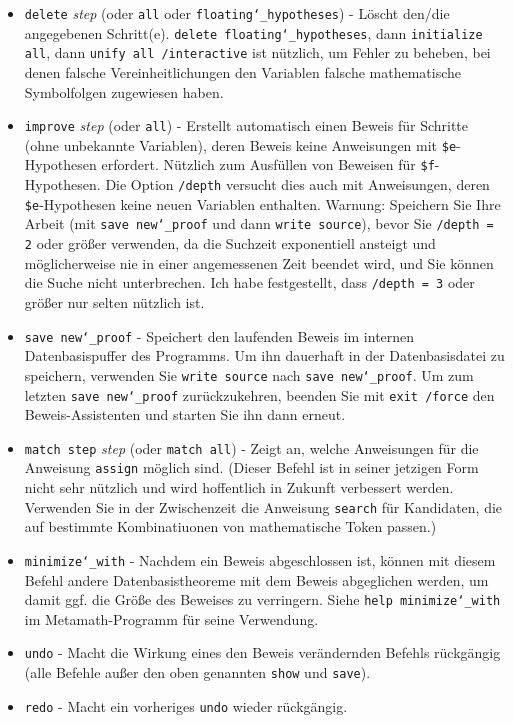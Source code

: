 \begin{itemize}
\item[]
    \texttt{delete} {\em step} (oder \texttt{all} oder \texttt{floating{\char`\_}hypotheses}) - Löscht den/die angegebenen Schritt(e).  \texttt{delete floating{\char`\_}hypotheses}, dann\linebreak
    \texttt{initialize all}, dann \texttt{unify all /interactive} ist nützlich, um Fehler zu beheben, bei denen falsche Vereinheitlichungen den Variablen falsche mathematische Symbolfolgen zugewiesen haben.
\item[]
    \texttt{improve} {\em step} (oder \texttt{all}) - Erstellt automatisch einen Beweis für Schritte (ohne unbekannte Variablen), deren Beweis keine Anweisungen mit \texttt{\$e}-Hypothesen erfordert.  Nützlich zum Ausfüllen von Beweisen für \texttt{\$f}-Hypothesen.  Die Option \texttt{/depth} versucht dies auch mit Anweisungen, deren \texttt{\$e}-Hypothesen keine neuen Variablen enthalten.  {Warnung:} Speichern Sie Ihre Arbeit (mit \texttt{save new{\char`\_}proof} und dann \texttt{write source}), bevor Sie \texttt{/depth = 2} oder größer verwenden, da die Suchzeit exponentiell ansteigt und möglicherweise nie in einer angemessenen Zeit beendet wird, und Sie können die Suche nicht unterbrechen.  Ich habe festgestellt, dass \texttt{/depth = 3} oder größer nur selten nützlich ist.
 \item[]
    \texttt{save new{\char`\_}proof} - Speichert den laufenden Beweis im internen Datenbasispuffer des Programms.  Um ihn dauerhaft in der Datenbasisdatei zu speichern, verwenden Sie \texttt{write source} nach \texttt{save new{\char`\_}proof}.  Um zum letzten \texttt{save new{\char`\_}proof} zurückzukehren, beenden Sie mit \texttt{exit /force} den Beweis-Assistenten und starten Sie ihn dann erneut.
 \item[]
    \texttt{match step} {\em step} (oder \texttt{match all}) - Zeigt an, welche Anweisungen für die Anweisung \texttt{assign} möglich sind. (Dieser Befehl ist in seiner jetzigen Form nicht sehr nützlich und wird hoffentlich in Zukunft verbessert werden.  Verwenden Sie in der Zwischenzeit die Anweisung \texttt{search} für Kandidaten, die auf bestimmte Kombinatiuonen von mathematische Token passen.)
 \item[]
 \texttt{minimize{\char`\_}with}
     - Nachdem ein Beweis abgeschlossen ist, können mit diesem Befehl andere Datenbasistheoreme mit dem Beweis abgeglichen werden, um damit ggf. die Größe des Beweises zu verringern.  Siehe \texttt{help minimize{\char`\_}with} im Metamath-Programm für seine Verwendung.
 \item[]
 \texttt{undo}
    - Macht die Wirkung eines den Beweis verändernden Befehls rückgängig (alle Befehle außer den oben genannten \texttt{show} und \texttt{save}).
 \item[]
 \texttt{redo}
    - Macht ein vorheriges \texttt{undo} wieder rückgängig.
\end{itemize}

